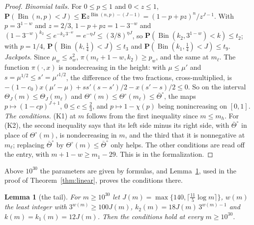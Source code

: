 \documentclass[11pt]{amsart}
\newtheorem{lemma}[theorem]{Lemma}
\theoremstyle{definition}
\numberwithin{equation}{section}
\newcommand{\lean}[1]{\ignorespaces}
\newcommand{\E}{\mathbf{E}}
\renewcommand{\P}{\mathbf{P}}
\newcommand{\Bin}{\operatorname{Bin}}
\begin{document}
\begin{proof}
\emph{Binomial tails.} For $0\le p\le1$ and $0<z\le1$, $\P(\Bin(n,p)<J)\le\E z^{\Bin(n,p)-(J-1)}=(1-p+pz)^n/z^{J-1}$. With $p=3^{1-w}$ and $z=2/3$, $1-p+pz=1-3^{-w}$ and $(1-3^{-w})^{k_2}\le e^{-k_2\,3^{-w}}=e^{-\eta J}\le(3/8)^{\eta J}$, so $\P(\Bin(k_2,3^{1-w})<k)\le t_2$; with $p=1/4$, $\P(\Bin(k,\frac14)<J)\le t_3$ and $\P(\Bin(k_1,\frac14)<J)\le t_9$. \emph{Jackpots.} Since $\mu_w\le s_w^2$, $\pi(m_\ell+1-w,k_2)\ge p_w$, and the same at $m_\ell$. The function $\pi(\cdot,x)$ is nondecreasing in the height: with $\mu\le\mu'$ and $s=\mu^{1/2}\le s'=\mu'^{1/2}$, the difference of the two fractions, cross-multiplied, is $-(1-c_0)x(\mu'-\mu)+ss'(s-s')/2-x(s'-s)/2\le0$. So on the interval $\Theta_J(m)\le \Theta_J(m_\ell)$ and $\Theta^\circ(m)\le \Theta^\circ(m_\ell)\le \bar\Theta^\circ$, the maps $p\mapsto(1-cp)^{J+1}$, $0\le c\le\frac23$, and $p\mapsto1-\chi(p)$ being nonincreasing on $[0,1]$. \emph{The conditions.} (K1) at $m$ follows from the first inequality since $m\le m_h$. For (K2), the second inequality says that its left side minus its right side, with $\bar\Theta^\circ$ in place of $\Theta^\circ(m)$, is nondecreasing in $m$, and the third that it is nonnegative at $m_\ell$; replacing $\bar\Theta^\circ$ by $\Theta^\circ(m)\le \bar\Theta^\circ$ only helps. The other conditions are read off the entry, with $m+1-w\ge m_1-29$. This is  in the formalization.
\end{proof}

Above $10^{30}$ the parameters are given by formulas, and Lemma~\ref{lem:tail}, used in the proof of Theorem~\ref{thm:linear}, proves the conditions there.

\begin{lemma}[the tail]\label{lem:tail}\lean{FrogModel.D3.LaneE.dprime_tail_holds, FrogModel.D3.Iface.dprime_tail, FrogModel.D3.Iface.Jtail, FrogModel.D3.Iface.Dtail, FrogModel.D3.Iface.ytail, FrogModel.D3.Iface.ktail}
For $m\ge10^{30}$ let $J(m)=\max\{140,\lceil\frac{11}5\log m\rceil\}$, $w(m)$ the least integer with $3^{w(m)}\ge100J(m)$, $k_2(m)=18J(m)\,3^{w(m)-1}$ and $k(m)=k_1(m)=12J(m)$. Then the conditions hold at every $m\ge10^{30}$.
\end{lemma}
\end{document}
